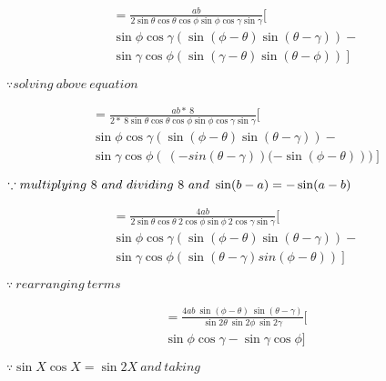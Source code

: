 \documentclass[journal,12pt,twocolumn]{IEEEtran}
\begin{document}
\vspace{0.3cm}
\begin{multline*}
    =\frac{ab}{2\sin\theta\cos\theta\cos\phi\sin\phi\cos\gamma\sin\gamma}[ \\ \sin\phi\cos\gamma \left(\sin(\phi-\theta)\sin(\theta-\gamma)\right) -\\ \sin\gamma\cos\phi\left(\sin(\gamma-\theta)\sin(\theta-\phi)\right)~
    ]
\end{multline*}
\begin{flushright}
$\because solving~above~equation $
\end{flushright}

\vspace{0.3cm}
\begin{multline*}
    =\frac{ab* ~8}{2*~8\sin\theta\cos\theta\cos\phi\sin\phi\cos\gamma\sin\gamma}[ \\ \sin\phi\cos\gamma \left(\sin(\phi-\theta)\sin(\theta-\gamma)\right) -\\ \sin\gamma\cos\phi\left(\ (-sin(\theta-\gamma))(-\sin(\phi-\theta)\right))~
    ]
\end{multline*}
\begin{flushright}
$\because multiplying~8 ~and ~dividing~8 ~and \\~ \sin (b-a)=-\sin (a-b) $
\end{flushright}

\vspace{0.3cm}
\begin{multline*}
    =\frac{4ab}{2\sin\theta\cos\theta~2\cos\phi\sin\phi~2\cos\gamma\sin\gamma}[ \\ \sin\phi\cos\gamma \left(\sin(\phi-\theta)\sin(\theta-\gamma)\right) -\\ \sin\gamma\cos\phi\left(\sin(\theta-\gamma)sin(\phi-\theta)\right)~
    ]
\end{multline*}
\begin{flushright}
$\because ~rearranging ~terms $
\end{flushright}

\vspace{0.3cm}
\begin{multline*}
    =\frac{4ab~ \sin(\phi-\theta)~\sin(\theta-\gamma) }{\sin2\theta~\sin2\phi~\sin2\gamma}[ \\ \sin\phi\cos\gamma - \sin\gamma\cos\phi
    ]
\end{multline*}
\begin{flushright}
$\because \sin X \cos X = \sin2X ~and ~taking ~ $
\end{flushright}
\end{document}
